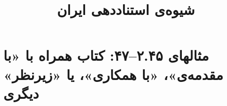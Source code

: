 \documentclass[a4paper,10pt]{article}
\begin{document}
\title{شیوه‌ی استناددهی ایران
 }
\author{}
\date{}
\maketitle



\section*{مثالهای ۲.۴۵--۴۷: کتاب همراه با «با مقدمه‌ی»، «با همکاری»، یا «زیرنظر» دیگری}

\cite{پرهام1364}\\
\cite{پورممتاز1381}\\
\cite{cullen1961}\\
\cite{حافظ1379}\\
\cite{hayek1994}\\






\end{document}
